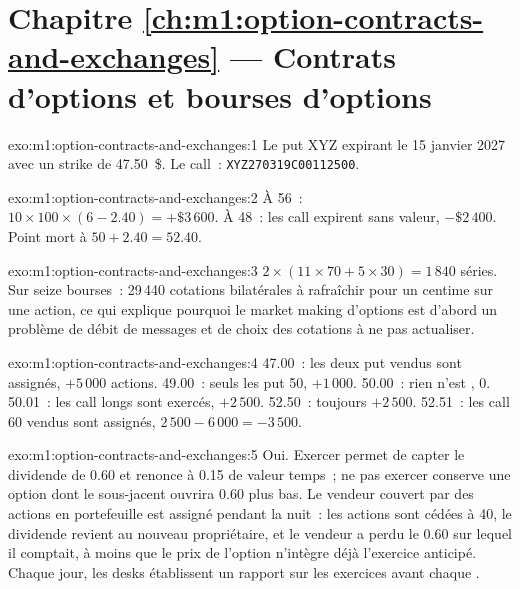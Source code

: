 \section*{Chapitre \ref{ch:m1:option-contracts-and-exchanges} --- Contrats d'options et bourses d'options}

\begin{solution}{exo:m1:option-contracts-and-exchanges:1}
Le put XYZ expirant le 15 janvier 2027 avec un strike de 47.50~\$. Le call~:
\texttt{XYZ\textvisiblespace\textvisiblespace\textvisiblespace270319C00112500}.
\end{solution}

\begin{solution}{exo:m1:option-contracts-and-exchanges:2}
À 56~: $10 \times 100 \times (6 - 2.40) = +\$3\,600$. À 48~: les call expirent
sans valeur, $-\$2\,400$. Point mort à $50 + 2.40 = 52.40$.
\end{solution}

\begin{solution}{exo:m1:option-contracts-and-exchanges:3}
$2 \times (11 \times 70 + 5 \times 30) = 1\,840$ séries. Sur seize bourses~:
29\,440 cotations bilatérales à rafraîchir pour un centime sur une action, ce qui explique pourquoi
le market making d'options est d'abord un problème de débit de messages et de choix des
cotations à ne pas actualiser.
\end{solution}

\begin{solution}{exo:m1:option-contracts-and-exchanges:4}
47.00~: les deux put vendus sont assignés, $+5\,000$ actions. 49.00~: seuls les
put 50, $+1\,000$. 50.00~: rien n'est , 0. 50.01~: les call longs sont
exercés, $+2\,500$. 52.50~: toujours $+2\,500$. 52.51~: les call 60 vendus sont
assignés, $2\,500 - 6\,000 = -3\,500$.
\end{solution}

\begin{solution}{exo:m1:option-contracts-and-exchanges:5}
Oui. Exercer permet de capter le dividende de 0.60 et renonce à 0.15 de valeur temps~;
ne pas exercer conserve une option dont le sous-jacent ouvrira 0.60 plus bas. Le
vendeur couvert par des actions en portefeuille est assigné pendant la nuit~: les actions sont cédées
à 40, le dividende revient au nouveau propriétaire, et le vendeur a perdu le
0.60 sur lequel il comptait, à moins que le prix de l'option n'intègre déjà
l'exercice anticipé. Chaque jour, les desks établissent un rapport sur les exercices avant chaque .
\end{solution}


